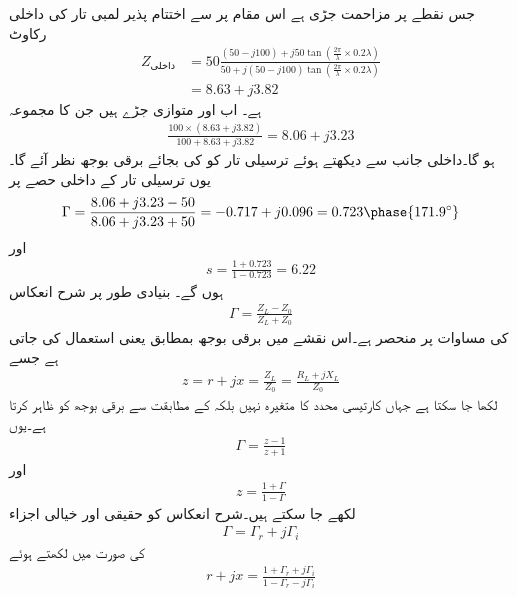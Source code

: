 جس نقطے پر  مزاحمت جڑی ہے اس مقام پر  سے اختتام پذیر  لمبی تار کی داخلی رکاوٹ
\begin{align*}
Z_{\text{داخلی}} &= 
50 \frac{(50-j100) +j 50 \tan \left( \frac{2\pi}{\lambda} \times 0.2 \lambda\right)}{50+j (50-j100)  \tan\left(  \frac{2\pi}{\lambda} \times 0.2 \lambda\right)}\\
&=8.63+j3.82
\end{align*}
ہے۔ اب  اور  متوازی جڑے ہیں جن کا مجموعہ
\begin{align*}
\frac{100\times(8.63+j3.82)}{100+8.63+j3.82}=8.06+j3.23
\end{align*}
ہو گا۔داخلی جانب سے دیکھتے ہوئے ترسیلی تار کو  کی بجائے  برقی بوجھ نظر آئے گا۔یوں ترسیلی تار کے داخلی حصے پر
\begin{align*}
\Gamma=\frac{8.06+j3.23-50}{8.06+j3.23+50}=-0.717+j0.096=0.723 \phase{171.9^{\circ}}
\end{align*} 
اور
\begin{align*}
s=\frac{1+0.723}{1-0.723}=6.22
\end{align*}
ہوں گے۔
 بنیادی طور پر شرح انعکاس
\begin{align*}
\Gamma=\frac{Z_L-Z_0}{Z_L+Z_0}
\end{align*}
کی مساوات پر منحصر ہے۔اس نقشے میں برقی بوجھ بمطابق  یعنی   استعمال کی جاتی ہے جسے
\begin{align*}
z=r+jx=\frac{Z_L}{Z_0}=\frac{R_L+j X_L}{Z_0}
\end{align*}
لکھا جا سکتا ہے جہاں  کارتیسی محدد کا متغیرہ نہیں بلکہ  کے مطابقت سے برقی بوجھ کو ظاہر کرتا ہے۔یوں
\begin{align*}
\Gamma=\frac{z-1}{z+1}
\end{align*}
  اور
\begin{align}\label{مساوات_ترسیلی_انعکاس_بالمقابل_قدرتی_رکاوٹ}
z=\frac{1+\Gamma}{1-\Gamma}
\end{align}
لکھے جا سکتے ہیں۔شرح انعکاس کو حقیقی اور خیالی اجزاء
\begin{align*}
\Gamma=\Gamma_r+j \Gamma_i
\end{align*}
کی صورت میں لکھتے ہوئے
\begin{align*}
r+j x =\frac{1+\Gamma_r+j \Gamma_i}{1-\Gamma_r-j\Gamma_i}
\end{align*} 

